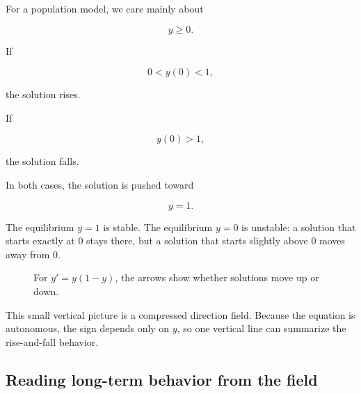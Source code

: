 For a population model, we care mainly about

\[
y\ge0.
\]

If

\[
0<y(0)<1,
\]

the solution rises.

If

\[
y(0)>1,
\]

the solution falls.

In both cases, the solution is pushed toward

\[
y=1.
\]

The equilibrium \(y=1\) is stable.  The equilibrium \(y=0\) is unstable: a solution that
starts exactly at \(0\) stays there, but a solution that starts slightly above \(0\) moves
away from \(0\).

\begin{figure}[h]
\centering
{}
\caption{For \(y'=y(1-y)\), the arrows show whether solutions move up or down.}
\label{fig:logistic-phase-line}
\end{figure}

This small vertical picture is a compressed direction field.  Because the equation is
autonomous, the sign depends only on \(y\), so one vertical line can summarize the
rise-and-fall behavior.

\subsection{Reading long-term behavior from the field}
\label{subsec:reading-long-term-behavior-field}

